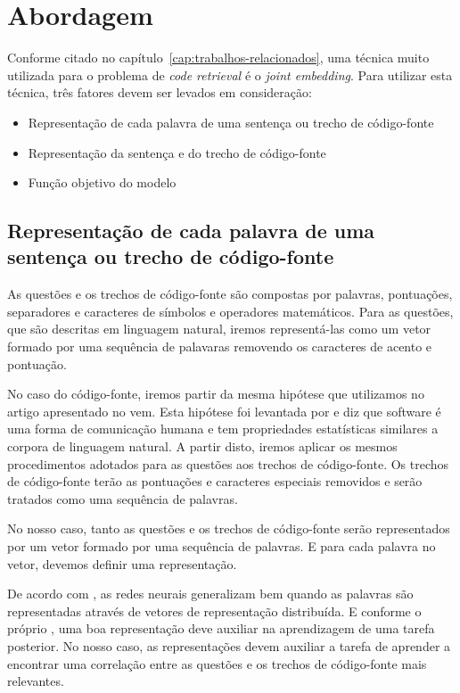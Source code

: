 \chapter{Abordagem}
\label{cap:abordagem}


Conforme citado no capítulo~\ref{cap:trabalhos-relacionados}, uma técnica muito utilizada para o problema de \textit{code retrieval} é o \textit{joint embedding}. Para utilizar esta técnica, três fatores devem ser levados em consideração:

\begin{itemize}
    \item Representação de cada palavra de uma sentença ou trecho de código-fonte
    \item Representação da sentença e do trecho de código-fonte
    \item Função objetivo do modelo
\end{itemize}

\section{Representação de cada palavra de uma sentença ou trecho de código-fonte}
\label{sec:abordagem-representacao-token}

As questões e os trechos de código-fonte são compostas por palavras, pontuações, separadores e caracteres de símbolos e operadores matemáticos. Para as questões, que são descritas em linguagem natural, iremos representá-las como um vetor formado por uma sequência de palavaras removendo os caracteres de acento e pontuação.

No caso do código-fonte, iremos partir da  mesma hipótese que utilizamos no artigo \cite{marcelo-vem-2019} apresentado no \acrfull{vem}. Esta hipótese foi levantada por \cite{Allamanis:2018:SML} e diz que software é uma forma de comunicação humana e tem propriedades estatísticas similares a corpora de linguagem natural. A partir disto, iremos aplicar os mesmos procedimentos adotados para as questões aos trechos de código-fonte. Os trechos de código-fonte terão as pontuações e caracteres especiais removidos e serão tratados como uma sequência de palavras.

No nosso caso, tanto as questões e os trechos de código-fonte serão representados por um vetor formado por uma sequência de palavras. E para cada palavra no vetor, devemos definir uma representação.

De acordo com \cite{Goodfellow-et-al-2016:representation-learning}, as redes neurais generalizam bem quando as palavras são representadas através de vetores de representação distribuída. E conforme o próprio \cite{Goodfellow-et-al-2016:representation-learning}, uma boa representação deve auxiliar na aprendizagem de uma tarefa posterior. No nosso caso, as representações devem auxiliar a tarefa de aprender a encontrar uma correlação entre as questões e os trechos de código-fonte mais relevantes.

